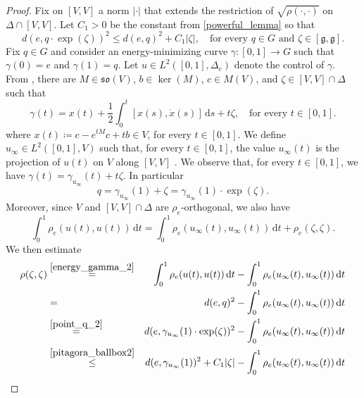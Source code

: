 \documentclass[a4paper,11pt,reqno]{amsart}
\theoremstyle{plain}
\theoremstyle{definition}
\newcommand{\g}{\mathfrak{g}}
\newcommand{\id}{e}
\newcommand{\de}{\mathrm{d}}
\newcommand{\coloneq}{\coloneqq}
\begin{document}
\begin{proof}
 Fix on $[V,V]$ a norm $\lvert \cdot \rvert$ that extends the restriction of $\sqrt{\rho(\cdot,\cdot)}$ on $\Delta \cap [V,V]$. Let $C_1>0$ be the constant from \cref{powerful_lemma} so that 
 \begin{equation} \label{pitagora_ballbox2}
 d(e,q \cdot \exp(\zeta))^2 \le d(e,q)^2 + C_1 \lvert \zeta \rvert, \quad \text{for every $q \in G$ and $\zeta \in [\g,\g]$.}
 \end{equation}
Fix $q \in G$ and consider an energy-minimizing curve $\gamma \colon [0,1] \to G$ such that $\gamma(0)=\id$ and $\gamma(1)=q$. Let $u \in L^2([0,1],\Delta_\id)$ denote the control of $\gamma$.
From \cite[Proposition~7.3.10]{donne2024metricliegroupscarnotcaratheodory}, there are $M \in \mathfrak{so}(V)$, $b \in \ker(M)$, $c \in M(V)$, and $\zeta \in [V,V] \cap \Delta$ such that 
\begin{equation*}
 \gamma(t)= x(t) + \frac{1}{2}\int^t_0 [x(s),\dot{x}(s)] \, \de s + t\zeta, \quad \text{for every $t \in [0,1]$.}
	\end{equation*}
 where $x(t) \coloneq c - e^{tM}c + tb \in V$, for every $t \in [0,1]$.
We define $u_\infty \in L^2([0,1],V)$ such that, for every $t \in [0,1]$, the value $u_\infty(t)$ is the projection of $u(t)$ on $V$ along $[V,V]$ . We observe that, for every $t \in [0,1]$, we have $\gamma(t)=\gamma_{u_\infty}(t)+t\zeta$. In particular
\begin{equation} \label{point_q_2}
 q = \gamma_{u_\infty}(1) + \zeta = \gamma_{u_\infty}(1) \cdot \exp(\zeta).
\end{equation}
Moreover, since $V$ and $[V,V] \cap \Delta$ are $\rho_\id$-orthogonal, we also have
\begin{equation} \label{energy_gamma_2}
 \int^1_0 \rho_\id(u(t),u(t))\, \de t =\int^1_0 \rho_\id(u_\infty(t),u_\infty(t))\, \de t + \rho_\id(\zeta,\zeta).
\end{equation}
We then estimate
\begin{eqnarray*}
 \rho(\zeta,\zeta) &\stackrel{\eqref{energy_gamma_2}}{=}& \int^1_0 \rho_\id(u(t),u(t))\, \de t - \int^1_0 \rho_\id(u_\infty(t),u_\infty(t))\, \de t \\
 &=& d(e,q)^2 - \int^1_0 \rho_\id(u_\infty(t),u_\infty(t))\, \de t \\
 &\stackrel{\eqref{point_q_2}}{=}& d(e,\gamma_{u_\infty}(1) \cdot \exp(\zeta))^2 - \int^1_0 \rho_\id(u_\infty(t),u_\infty(t))\, \de t \\
 &\stackrel{\eqref{pitagora_ballbox2}}{\le}& d(e,\gamma_{u_\infty}(1))^2 + C_1\lvert \zeta \rvert - \int^1_0 \rho_\id(u_\infty(t),u_\infty(t))\, \de t \\

\end{eqnarray*}
\end{proof}
\end{document}
